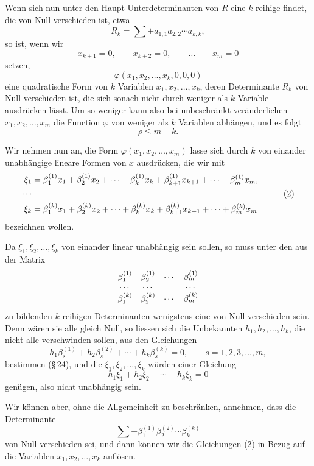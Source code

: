 \documentclass[11pt]{article}
\begin{document}
Wenn sich nun unter den Haupt-Unterdeterminanten von $R$ eine $k$-reihige findet, die von Null verschieden ist, etwa
\[
        R_k=\sum \pm a_{1,1}a_{2,2}\cdots a_{k,k},
\]
so ist, wenn wir
\[
        x_{k+1}=0,
        \qquad x_{k+2}=0,
        \qquad\ldots\qquad x_m=0
\]
setzen,
\[
        \varphi(x_1,x_2,\ldots,x_k,0,0,0)
\]
eine quadratische Form von $k$ Variablen $x_1,x_2,\ldots,x_k$, deren Determinante $R_k$ von Null verschieden ist, die sich sonach nicht durch weniger als $k$ Variable ausdr\"ucken l\"asst. Um so weniger kann also bei unbeschr\"ankt ver\"anderlichen $x_1,x_2,\ldots,x_m$ die Function $\varphi$ von weniger als $k$ Variablen abh\"angen, und es folgt
\begin{equation}
        \rho\leq m-k.
\tag{1}
\end{equation}

Wir nehmen nun an, die Form $\varphi(x_1,x_2,\ldots,x_m)$ lasse sich durch $k$ von einander unabh\"angige lineare Formen von $x$ ausdr\"ucken, die wir mit
\begin{equation}
\begin{aligned}
 \xi_1&=\beta^{(1)}_1x_1+\beta^{(1)}_2x_2+\cdots+\beta^{(1)}_kx_k+\beta^{(1)}_{k+1}x_{k+1}+\cdots+\beta^{(1)}_mx_m,\cr
 \cdots&\cr
 \xi_k&=\beta^{(k)}_1x_1+\beta^{(k)}_2x_2+\cdots+\beta^{(k)}_kx_k+\beta^{(k)}_{k+1}x_{k+1}+\cdots+\beta^{(k)}_mx_m
\end{aligned}
\tag{2}
\end{equation}
bezeichnen wollen.

Da $\xi_1,\xi_2,\ldots,\xi_k$ von einander linear unabh\"angig sein sollen, so muss unter den aus der Matrix
\[
\begin{array}{cccc}
 \beta^{(1)}_1&\beta^{(1)}_2&\cdots&\beta^{(1)}_m\cr
 \cdots&\cdots&&\cdots\cr
 \beta^{(k)}_1&\beta^{(k)}_2&\cdots&\beta^{(k)}_m
\end{array}
\]
zu bildenden $k$-reihigen Determinanten wenigstens eine von Null verschieden sein. Denn w\"aren sie alle gleich Null, so liessen sich die Unbekannten $h_1,h_2,\ldots,h_k$, die nicht alle verschwinden sollen, aus den Gleichungen
\[
        h_1\beta^{(1)}_s+h_2\beta^{(2)}_s+\cdots+h_k\beta^{(k)}_s=0,
        \qquad s=1,2,3,\ldots,m,
\]
bestimmen (\S\,24), und die $\xi_1,\xi_2,\ldots,\xi_k$ w\"urden einer Gleichung
\[
        h_1\xi_1+h_2\xi_2+\cdots+h_k\xi_k=0
\]
gen\"ugen, also nicht unabh\"angig sein.

Wir k\"onnen aber, ohne die Allgemeinheit zu beschr\"anken, annehmen, dass die Determinante
\[
        \sum\pm \beta^{(1)}_1\beta^{(2)}_2\cdots\beta^{(k)}_k
\]
von Null verschieden sei, und dann k\"onnen wir die Gleichungen (2) in Bezug auf die Variablen $x_1,x_2,\ldots,x_k$ aufl\"osen.
\end{document}
